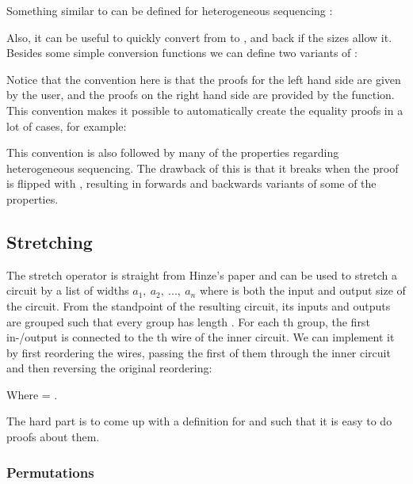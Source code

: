Something similar to  can be defined for heterogeneous
sequencing :


Also, it can be useful to quickly convert from  to , and
back if the sizes allow it.
Besides some simple conversion functions we can define two variants of
:


Notice that the convention here is that the proofs for the left hand
side are given by the user, and the proofs on the right hand side are
provided by the function.
This convention makes it possible to automatically create the equality
proofs in a lot of cases, for example:


This convention is also followed by many of the properties regarding
heterogeneous sequencing.
The drawback of this is that it breaks when the proof is flipped with
, resulting in forwards and backwards variants of some of
the properties.

\subsection{Stretching}\label{stretching}

The stretch operator  is straight from Hinze's paper and can
be used to stretch a circuit by a list of widths $a_1,\ a_2,\ ...,\
a_n$ where  is both the input and output size of the circuit.
From the standpoint of the resulting circuit, its inputs and outputs
are grouped such that every group  has length \AB{aᵢ}.
For each \AB{i}th group, the first in-/output is connected to the
\AF{i}th wire of the inner circuit.
We can implement it by first reordering the wires, passing the first
\AF{n} of them through the inner circuit and then reversing the
original reordering:


Where    =  \AY{(}  \AY{(}
\AF{\_+\_} \AB{m} \AY{)} \AB{as} \AY{)}.

The hard part is to come up with a definition for  and
 such that it is easy to do proofs about them.

\subsubsection{Permutations}\label{permutations}

